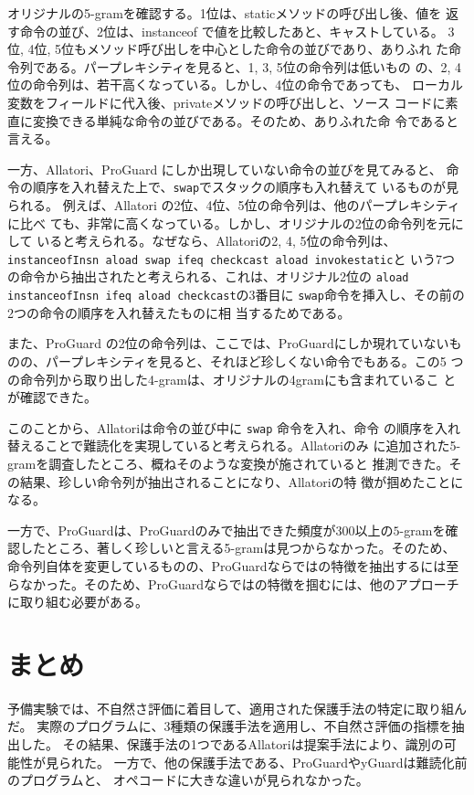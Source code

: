 \documentclass[12pt,twoside]{jreport}
\begin{document}
オリジナルの5-gramを確認する。1位は、staticメソッドの呼び出し後、値を
返す命令の並び、2位は、instanceof で値を比較したあと、キャストしている。
3位, 4位, 5位もメソッド呼び出しを中心とした命令の並びであり、ありふれ
た命令列である。パープレキシティを見ると、1, 3, 5位の命令列は低いもの
の、2, 4位の命令列は、若干高くなっている。しかし、4位の命令であっても、
ローカル変数をフィールドに代入後、privateメソッドの呼び出しと、ソース
コードに素直に変換できる単純な命令の並びである。そのため、ありふれた命
令であると言える。

一方、Allatori、ProGuard にしか出現していない命令の並びを見てみると、
命令の順序を入れ替えた上で、\texttt{swap}でスタックの順序も入れ替えて
いるものが見られる。
%
例えば、Allatori の2位、4位、5位の命令列は、他のパープレキシティに比べ
ても、非常に高くなっている。しかし、オリジナルの2位の命令列を元にして
いると考えられる。なぜなら、Allatoriの2, 4, 5位の命令列は、
\texttt{instanceofInsn aload swap ifeq checkcast aload invokestatic}と
いう7つの命令から抽出されたと考えられる、これは、オリジナル2位の
\texttt{aload instanceofInsn ifeq aload checkcast}の3番目に
\texttt{swap}命令を挿入し、その前の2つの命令の順序を入れ替えたものに相
当するためである。

また、ProGuard の2位の命令列は、ここでは、ProGuardにしか現れていないも
のの、パープレキシティを見ると、それほど珍しくない命令でもある。この5
つの命令列から取り出した4-gramは、オリジナルの4gramにも含まれているこ
とが確認できた。

このことから、Allatoriは命令の並び中に \texttt{swap} 命令を入れ、命令
の順序を入れ替えることで難読化を実現していると考えられる。Allatoriのみ
に追加された5-gramを調査したところ、概ねそのような変換が施されていると
推測できた。その結果、珍しい命令列が抽出されることになり、Allatoriの特
徴が掴めたことになる。

一方で、ProGuardは、ProGuardのみで抽出できた頻度が300以上の$5$-gramを確
認したところ、著しく珍しいと言える5-gramは見つからなかった。そのため、
命令列自体を変更しているものの、ProGuardならではの特徴を抽出するには至
らなかった。そのため、ProGuardならではの特徴を掴むには、他のアプローチ
に取り組む必要がある。

\section{まとめ}

予備実験では、不自然さ評価に着目して、適用された保護手法の特定に取り組んだ。
実際のプログラムに、3種類の保護手法を適用し、不自然さ評価の指標を抽出した。
その結果、保護手法の1つであるAllatoriは提案手法により、識別の可能性が見られた。
一方で、他の保護手法である、ProGuardやyGuardは難読化前のプログラムと、
オペコードに大きな違いが見られなかった。
\end{document}
